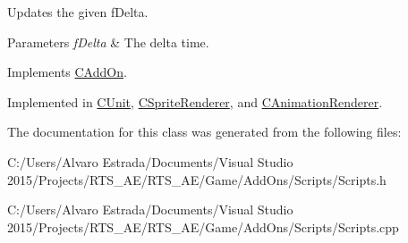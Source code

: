 Updates the given f\+Delta. 


\begin{DoxyParams}{Parameters}
{\em f\+Delta} & The delta time. \\
\hline
\end{DoxyParams}


Implements \hyperlink{class_c_add_on_af7d49c59fd975bcc7b98e14f437cc1ae}{C\+Add\+On}.



Implemented in \hyperlink{class_c_unit_a5f46103027aaf83b2b47c0711640bd69}{C\+Unit}, \hyperlink{class_c_sprite_renderer_a7923c1ef70f2f8adc172a94ce743e67b}{C\+Sprite\+Renderer}, and \hyperlink{class_c_animation_renderer_a2ac2237cb706d2f6d45a88a86543e008}{C\+Animation\+Renderer}.



The documentation for this class was generated from the following files\+:\begin{DoxyCompactItemize}
\item 
C\+:/\+Users/\+Alvaro Estrada/\+Documents/\+Visual Studio 2015/\+Projects/\+R\+T\+S\+\_\+\+A\+E/\+R\+T\+S\+\_\+\+A\+E/\+Game/\+Add\+Ons/\+Scripts/Scripts.\+h\item 
C\+:/\+Users/\+Alvaro Estrada/\+Documents/\+Visual Studio 2015/\+Projects/\+R\+T\+S\+\_\+\+A\+E/\+R\+T\+S\+\_\+\+A\+E/\+Game/\+Add\+Ons/\+Scripts/Scripts.\+cpp\end{DoxyCompactItemize}
